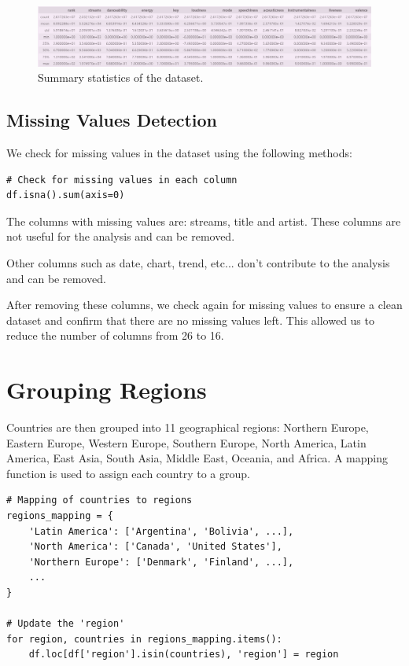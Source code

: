 \begin{figure}[h]
    \centering
    \includegraphics[width=1.1\textwidth]{media/describe.png} 
    \caption{Summary statistics of the dataset.}
    \label{df.describe()}
\end{figure}




\subsection{Missing Values Detection}

We check for missing values in the dataset using the following methods:

\begin{verbatim}
# Check for missing values in each column
df.isna().sum(axis=0)
\end{verbatim}

The columns with missing values are: streams, title and artist. These columns are not useful for the analysis and can be removed.


Other columns such as date, chart, trend, etc... don't contribute to the analysis and can be removed.


After removing these columns, we check again for missing values to ensure a clean dataset and confirm that there are no missing values left.
This allowed us to reduce the number of columns from 26 to 16.



\section{Grouping Regions}

Countries are then grouped into 11 geographical regions: Northern Europe, Eastern Europe, Western Europe, Southern Europe, North America, Latin America, East Asia, South Asia, Middle East, Oceania, and Africa. A mapping function is used to assign each country to a group.

\begin{verbatim}
# Mapping of countries to regions
regions_mapping = {
    'Latin America': ['Argentina', 'Bolivia', ...],
    'North America': ['Canada', 'United States'],
    'Northern Europe': ['Denmark', 'Finland', ...],
    ...
}
    
# Update the 'region' 
for region, countries in regions_mapping.items():
    df.loc[df['region'].isin(countries), 'region'] = region
\end{verbatim}




